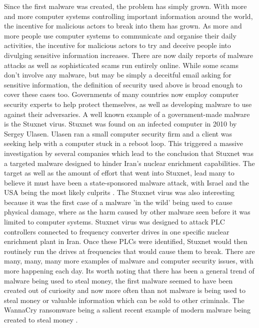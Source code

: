 Since the first malware was created, the problem has simply grown. With more and more computer systems controlling important information around the world, the incentive for malicious actors to break into them has grown. As more and more people use computer systems to communicate and organise their daily activities, the incentive for malicious actors to try and deceive people into divulging sensitive information increases. There are now daily reports of malware attacks as well as sophisticated scams run entirely online. While some scams don't involve any malware, but may be simply a deceitful email asking for sensitive information, the definition of security used above is broad enough to cover these cases too. Governments of many countries now employ computer security experts to help protect themselves, as well as developing malware to use against their adversaries. A well known example of a  government-made malware is the Stuxnet virus. Stuxnet was found on an infected computer in 2010 by Sergey Ulasen. Ulasen ran a small computer security firm and a client was seeking help with a computer stuck in a reboot loop. This triggered a massive investigation by several companies which lead to the conclusion that Stuxnet was a targeted malware designed to hinder Iran's nuclear enrichment capabilities. The target as well as the amount of effort that went into Stuxnet, lead many to believe it must have been a state-sponsored malware attack, with Israel and the USA being the most likely culprits 
\cite{RN91}\cite{RN92}. The Stuxnet virus was also interesting because it was the first case of a malware 'in the wild' being used to cause physical damage, where as the harm caused by other malware seen before it was limited to computer systems. Stuxnet virus was designed to attack PLC controllers connected to frequency converter drives in one specific nuclear enrichment plant in Iran. Once these PLCs were identified, Stuxnet would then routinely run the drives at frequencies that would cause them to break. There are many, many, many more examples of malware and computer security issues, with more happening each day. Its worth noting that there has been a general trend of malware being used to steal money, the first malware seemed to have been created out of curiosity and now more often than not malware is being used to steal money or valuable information which can be sold to other criminals. The WannaCry ransomware being a salient recent example of modern malware being created to steal money 
\cite{RN94}. 

